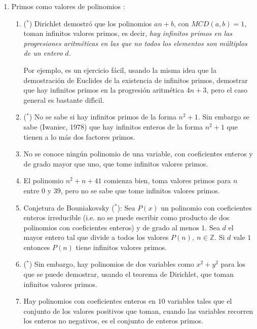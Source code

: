\begin{enumerate}
\begin{enumerate}
 \item ($^*$) Se sabe que todos los pares de primos gemelos $(p,p+2),\ p\ge 5$
son de
la forma $(6n-1,6n+1)$ para alg\'un $n$. Esto se debe a que todo primo mayor o
igual a cinco es de la forma $6n-1$ o de la forma $6n+1.$
 
\item ($^*$) {\sc Ejercicio}: encontrar todos los enteros $p$ tales que
$p,p+4,p+6,p+10,p+12,p+16,p+22$ sean todos primos.
 
 
 
 
 \end{enumerate}
 
 \item{\sc Primos como valores de polinomios }:
 \begin{enumerate}
 \item ($^*$) Dirichlet demostr\'o que los polinomios  $an+b$, con
$MCD(a,b)=1$, toman infinitos valores primos, es decir, {\itshape
 hay infinitos primos en las  progresiones aritm\'eticas en las que no todos los
elementos son m\'ultiplos de un entero $d$.}
 
 Por ejemplo,  es un ejercicio f\'acil,  usando la misma idea que la
demostraci\'on de Euclides
de la existencia de infinitos primos, demostrar que hay infinitos primos en la
progresi\'on aritm\'etica $4n+3$, pero el caso general es bastante dif\'{\i}cil.
 
 \item ($^*$) No se sabe si hay infinitos primos de la forma $n^2+1$. Sin
embargo se
sabe (Iwaniec, 1978)
que hay infinitos enteros de la forma  $n^2+1$ que tienen a lo m\'as dos
factores primos.
 \item No se conoce ning\'un polinomio de una variable, con coeficientes enteros
 y de grado mayor que uno, que tome infinitos valores primos.
 \item El polinomio $n^2+n+41$ comienza bien, toma valores primos para $n$ entre
$0$ y $39$, pero no se sabe que tome infinitos valores primos.
 
 \item {\sc Conjetura de Bouniakovsky ($^*$)}: Sea $P(x)$ un polinomio con
coeficientes
enteros  irreducible (i.e. no se puede escribir como producto de dos polinomios
con coeficientes enteros) y  de grado al menos $1$. Sea  $d$ el mayor entero tal
que divide a todos los valores  $P(n),\ n\in \mathbb{Z}$. Si $d$ vale $1$
entonces $P(n)$ tiene infinitos valores primos.  
 
 
 \item ($^*$) Sin embargo, hay polinomios de dos variables como $x^2+y^2$ para
los que
se puede demostrar, usando el teorema de Dirichlet, que toman infinitos valores
primos. 

\item Hay polinomios con coeficientes enteros en $10$ variables tales que el
conjunto de  los valores positivos que toman, cuando las variables recorren los
enteros no negativos, es el conjunto de enteros primos.
\end{enumerate}
\end{enumerate}

